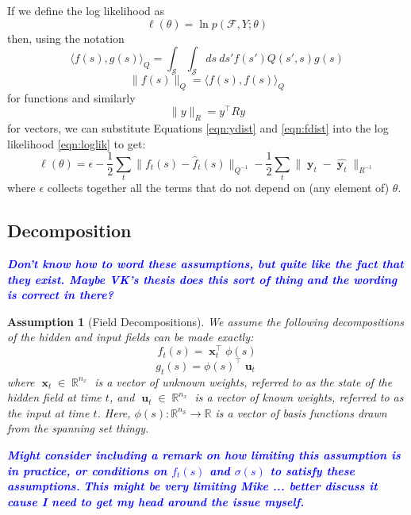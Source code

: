 \documentclass{IEEEtran}
\newcommand{\todo}[1]{\textsf{\emph{\textbf{\textcolor{blue}{#1}}}}}
\newcommand{\inner}[3]{\langle#1,#2\rangle_{#3}}
\newcommand{\dist}[2]{\|#1\|_{#2}}
\DeclareMathOperator{\R}{\mathbb{R}}
\DeclareMathOperator{\xvec}{\mathbf{x}}
\DeclareMathOperator{\uvec}{\mathbf{u}}
\DeclareMathOperator{\yvec}{\mathbf{y}}
\DeclareMathOperator{\onto}{\rightarrow}
\newtheorem{assumption}{Assumption}
\begin{document}
If we define the log likelihood as
\begin{equation}
	\label{eqn:loglik}
	\ell(\theta) = \ln p(\mathcal{F}, Y;\theta)
\end{equation}
then, using the notation
\begin{equation}
	\inner{f(s)}{g(s)}{Q} = \int_\mathcal{S} \int_\mathcal{S} ds~ds' f(s') Q(s',s) g(s)
\end{equation}
\begin{equation}
	\dist{f(s)}{Q} = \inner{f(s)}{f(s)}{Q}
\end{equation}
for functions and similarly
\begin{equation}
	\dist{y}{R} = y^\top Ry
\end{equation}
for vectors, we can substitute Equations \ref{eqn:ydist} and \ref{eqn:fdist} into the log likelihood \ref{eqn:loglik} to get:
\begin{equation}
	\ell(\theta) =  \epsilon  - \frac{1}{2}\sum_t\dist{f_t(s) - \hat{f}_t(s)}{Q^{-1}} - \frac{1}{2}\sum_t\dist{\yvec_t-\hat{\yvec_t}}{R^{-1}}
\end{equation}
where $\epsilon$ collects together all the terms that do not depend on (any element of) $\theta$.

\subsection{Decomposition}

\todo{Don't know how to word these assumptions, but quite like the fact that they exist. Maybe VK's thesis does this sort of thing and the wording is correct in there?}

\begin{assumption}[Field Decompositions]
	\label{ass:fielddecomp}
	We assume the following decompositions of the hidden and input fields can be made exactly:
\begin{equation}
	\label{eq:f decomp}
	f_t(s) = \xvec_t^\top\phi(s)
\end{equation}
\begin{equation}
	g_t(s) = \phi(s)^\top\uvec_t
\end{equation}	 
where $\xvec_t \in \R^{n_x}$ is a vector of unknown weights, referred to as the state of the hidden field at time $t$, and $\uvec_t \in \R^{n_x}$ is a vector of known weights, referred to as the input at time $t$. Here, $\phi(s) : \mathbb{R}^{n_\mathcal{S}} \onto \mathbb{R}$ is a vector of basis functions drawn from the spanning set thingy.
\end{assumption}
\todo{Might consider including a remark on how limiting this assumption is in practice, or conditions on $f_t(s)$ and $\sigma(s)$ to satisfy these assumptions.}
\todo{This might be very limiting Mike ... better discuss it cause I need to  get my head around the issue myself.}
\end{document}
